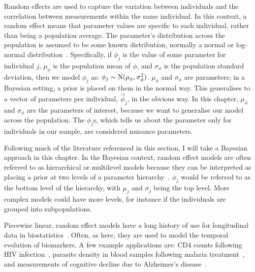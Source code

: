 \documentclass[thesis.tex]{subfiles}
\begin{document}
Random effects are used to capture the variation between individuals and the correlation between measurements within the same individual.
In this context, a random effect means that parameter values are specific to each individual, rather than being a population average.
The parameter's distribution across the population is assumed to be some known distribution, normally a normal or log-normal distribution~\autocite[chapter 24]{lashModern}.
Specifically, if $\phi_j$ is the value of some parameter for individual $j$, $\mu_\phi$ is the population mean of $\phi$, and $\sigma_\phi$ is the population standard deviation, then we model $\phi_j$ as: $\phi_j \sim \operatorname{N}(\mu_\phi, \sigma_\phi^2)$.
$\mu_\phi$ and $\sigma_\phi$ are parameters; in a Bayesian setting, a prior is placed on them in the normal way.
This generalises to a vector of parameters per individual, $\vec{\phi}_j$, in the obvious way.
In this chapter, $\mu_\phi$ and $\sigma_\phi$ are the parameters of interest, because we want to generalise our model across the population.
The $\phi_j$s, which tells us about the parameter only for individuals in our sample, are considered nuisance parameters.

Following much of the literature referenced in this section, I will take a Bayesian approach in this chapter.
In the Bayesian context, random effect models are often referred to as hierarchical or multilevel models because they can be interpreted as placing a prior at two levels of a parameter hierarchy~\autocite[chapter 5]{gelmanBDA}.
$\phi_j$ would be referred to as the bottom level of the hierarchy, with $\mu_j$ and $\sigma_j$ being the top level.
More complex models could have more levels, for instance if the individuals are grouped into subpopulations.

Piecewise linear, random effect models have a long history of use for longitudinal data in biostatistics~\autocites{slateStatistical}.
Often, as here, they are used to model the temporal evolution of biomarkers.
A few example applications are: CD4 counts following HIV infection~\autocites{langeHierarchical,lynchPredicting}, parasite density in blood samples following malaria treatment~\autocites{fogartyBayesian}, and measurements of cognitive decline due to Alzheimer's disease~\autocites{bealisleBayesian}.

\section{\texorpdfstring{\textcite{hakkiOnset}}{Hakki \etal (2022)}} \label{ATACCC:sec:hakki}
\end{document}
